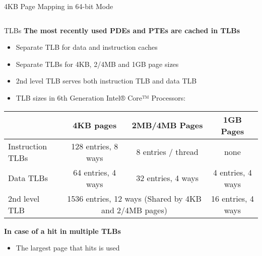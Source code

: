 \documentclass[aspectratio=169,12pt]{beamer}
\begin{document}
\begin{frame}{4KB Page Mapping in 64-bit Mode}
\begin{columns}[T]
\begin{column}{0.56\textwidth}
\begin{center}
\end{center}
\end{column}
\end{columns}
\end{frame}




\begin{frame}{TLBs}
\textbf{The most recently used PDEs and PTEs are cached in TLBs}
\begin{itemize}
\item Separate TLB for data and instruction caches
\item Separate TLBs for 4KB, 2/4MB and 1GB page sizes
\item 2nd level TLB serves both instruction TLB and data TLB
\item TLB sizes in 6th Generation Intel® Core™ Processors:
\end{itemize}

\begin{center}
\footnotesize
\begin{tabular}{|l|c|c|c|}
\hline
 & \textbf{4KB pages} & \textbf{2MB/4MB Pages} & \textbf{1GB Pages} \\
\hline
Instruction TLBs & 128 entries, 8 ways & 8 entries / thread & none \\
\hline
Data TLBs & 64 entries, 4 ways & 32 entries, 4 ways & 4 entries, 4 ways \\
\hline
2nd level TLB & \multicolumn{2}{c|}{1536 entries, 12 ways (Shared by 4KB and 2/4MB pages)} & 16 entries, 4 ways \\
\hline
\end{tabular}
\end{center}

\textbf{In case of a hit in multiple TLBs}
\begin{itemize}
\item The largest page that hits is used
\end{itemize}
\end{frame}
\end{document}
